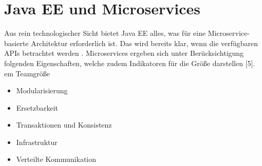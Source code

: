 \section{Java EE und Microservices}
Aus rein technologischer Sicht bietet Java EE alles, was für eine Microservice-basierte Architektur erforderlich ist. Das wird bereits klar, wenn die verfügbaren APIs betrachtet werden \cite{jaxcenter.2016}. Microservices ergeben sich unter Berücksichtigung folgenden Eigenschaften, welche zudem Indikatoren für die Größe darstellen [5].                                                                                                                                                                                                                                                                                                                                                                                                                                                                                  em Teamgröße
\begin{itemize}
	\item Modularisierung
	\item Ersetzbarkeit
	\item Transaktionen und Konsistenz
	\item Infrastruktur
	\item Verteilte Kommunikation	
\end{itemize}

